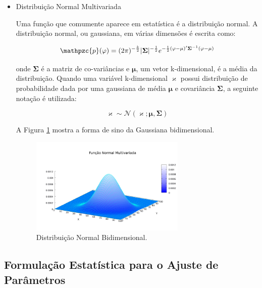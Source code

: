 {\begin{itemize}
\item Distribuição Normal Multivariada

Uma função que comumente aparece em estatística é a distribuição normal. A
distribuição normal, ou gaussiana, em várias dimensões é escrita como:

\begin{equation}
\mathpzc{p}(\mathbf{\varphi}) = (2\pi)^{-\frac{k}{2}} | \mathbf{\Sigma} | ^ {-\frac{1}{2}} e^{-\frac{1}{2}(\mathbf{\varphi} - \mathbf{\mu})'\mathbf{\Sigma}^{-1}(\mathbf{\varphi} - \mathbf{\mu})}
\end{equation}

onde $\mathbf{\Sigma}$ é a matriz de co-variâncias e $\mathbf{\mu}$, um vetor
k-dimensional, é a média da distribuição. Quando uma variável k-dimensional
$\mathbf{\varkappa}$ possui distribuição de probabilidade dada por uma gaussiana
de média $\mathbf{\mu}$ e covariância $\mathbf{\Sigma}$, a seguinte notação é
utilizada:

\begin{equation}
\mathbf{\varkappa} \sim \mathcal{N}(\mathbf{\varkappa}; \mathbf{\mu}, \mathbf{\Sigma})
\end{equation}

A Figura \ref{fig:normal} mostra a forma de sino da Gaussiana bidimensional.

\begin{figure}[!htbp]
\centering
\includegraphics[width=0.7\textwidth]{figs/multivariate.png}
\caption{Distribuição Normal Bidimensional.}
\label{fig:normal}
\end{figure}

\end{itemize}

\subsection{Formulação Estatística para o Ajuste de Parâmetros}
\label{ssec:tracking-parameter-fitting}

}

